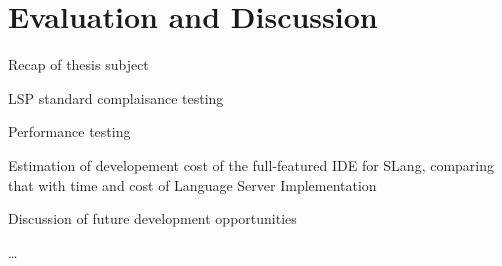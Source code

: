 \chapter{Evaluation and Discussion}
\label{chap:eval}

Recap of thesis subject

LSP standard complaisance testing

Performance testing

Estimation of developement cost of the full-featured IDE for SLang, comparing that with time and cost of Language Server Implementation

Discussion of future development opportunities

\ldots
